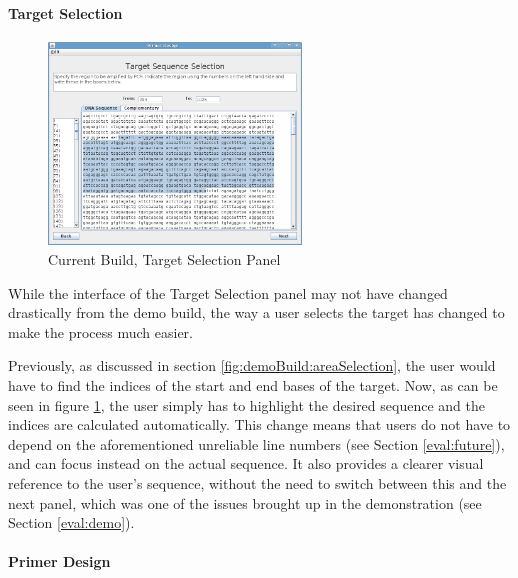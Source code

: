 \paragraph{Target Selection}

\begin{figure}[!t]
  \begin{center}
    \includegraphics[width=0.6\textwidth]{./images/currentBuild/areaSelection.png}
    \caption{
      \label{fig:currentBuild:areaSelection}
      Current Build, Target Selection Panel
    }
  \end{center}
\end{figure}

While the interface of the Target Selection panel may not have changed
drastically from the demo build, the way a user selects the target has
changed to make the process much easier.

Previously, as discussed in section \ref{fig:demoBuild:areaSelection},
the user would have to find the indices of the start and end bases of
the target.
Now, as can be seen in figure \ref{fig:currentBuild:areaSelection},
the user simply has to highlight the desired sequence and the indices
are calculated automatically.
This change means that users do not have to depend on the
aforementioned unreliable line numbers (see Section
\ref{eval:future}), and can focus instead on the actual sequence.
It also provides a clearer visual reference to the user's sequence,
without the need to switch between this and the next panel, which was
one of the issues brought up in the demonstration (see Section
\ref{eval:demo}).

\paragraph{Primer Design}

